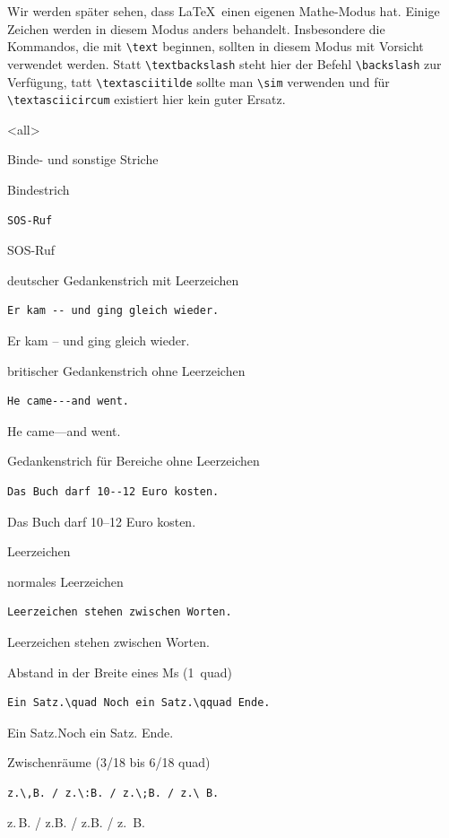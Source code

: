 Wir werden später sehen, dass \LaTeX\ einen eigenen Mathe-Modus hat. Einige Zeichen werden in diesem Modus anders behandelt. Insbesondere die Kommandos, die mit \lstinline-\text- beginnen, sollten in diesem Modus mit Vorsicht verwendet werden. Statt \lstinline-\textbackslash- steht hier der Befehl \lstinline-\backslash- zur Verfügung, tatt \lstinline-\textasciitilde- sollte man \lstinline-\sim- verwenden und für \lstinline-\textasciicircum- existiert hier kein guter Ersatz.

\mode
<all>

\begin{Frame}[fragile]{Binde- und sonstige Striche}
  \begin{looseitemize}
    \item Bindestrich
      \begin{lstlisting}[gobble=8]
        SOS-Ruf
      \end{lstlisting}
      SOS-Ruf
    \item deutscher Gedankenstrich mit Leerzeichen
      \begin{lstlisting}[gobble=8]
        Er kam -- und ging gleich wieder.
      \end{lstlisting}
      Er kam -- und ging gleich wieder.
    \item britischer Gedankenstrich ohne Leerzeichen
      \begin{lstlisting}[gobble=8]
        He came---and went.
      \end{lstlisting}
      He came---and went.
    \item Gedankenstrich für Bereiche ohne Leerzeichen
      \begin{lstlisting}[gobble=8]
        Das Buch darf 10--12 Euro kosten.
      \end{lstlisting}
      Das Buch darf 10--12 Euro kosten.
  \end{looseitemize}
\end{Frame}

\begin{Frame}[fragile]{Leerzeichen}
  \begin{looseitemize}
    \item normales Leerzeichen
      \begin{lstlisting}[gobble=8]
        Leerzeichen stehen zwischen Worten.
      \end{lstlisting}
      Leerzeichen stehen zwischen Worten.
    \item Abstand in der Breite eines Ms (1~quad)
      \begin{lstlisting}[gobble=8]
        Ein Satz.\quad Noch ein Satz.\qquad Ende.
      \end{lstlisting}
      Ein Satz.\quad Noch ein Satz. \qquad Ende.
    \item Zwischenräume (3/18 bis 6/18 quad)
      \begin{lstlisting}[gobble=8]
        z.\,B. / z.\:B. / z.\;B. / z.\ B.
      \end{lstlisting}
      z.\,B. / z.\:B. / z.\;B. / z.\ B.
  \end{looseitemize}
\end{Frame}

